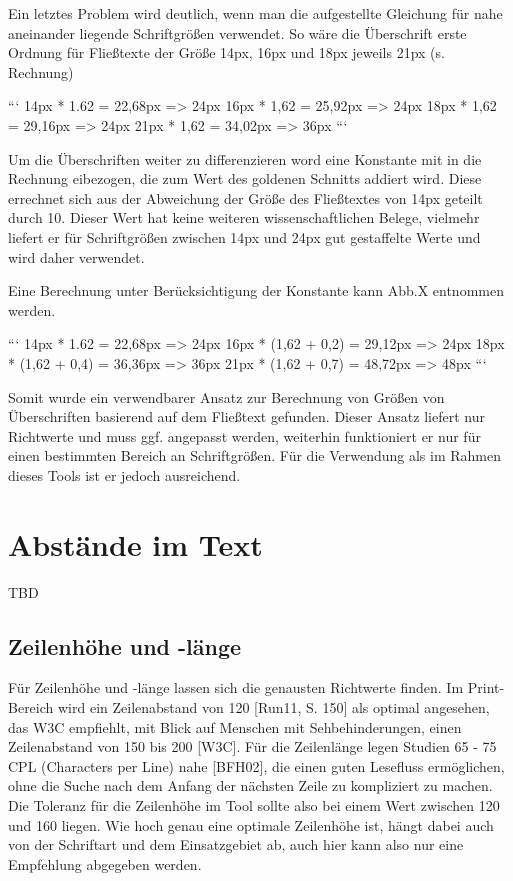Ein letztes Problem wird deutlich, wenn man die aufgestellte Gleichung für nahe aneinander liegende Schriftgrößen verwendet. So wäre die Überschrift erste Ordnung für Fließtexte der Größe 14px, 16px und 18px jeweils 21px (s. Rechnung)

```
14px * 1.62 = 22,68px => 24px
16px * 1,62 = 25,92px => 24px
18px * 1,62 = 29,16px => 24px
21px * 1,62 = 34,02px => 36px
```

Um die Überschriften weiter zu differenzieren word eine Konstante mit in die Rechnung eibezogen, die zum Wert des goldenen Schnitts addiert wird. Diese errechnet sich aus der Abweichung der Größe des Fließtextes von 14px geteilt durch 10.
Dieser Wert hat keine weiteren wissenschaftlichen Belege, vielmehr liefert er für Schriftgrößen zwischen 14px und 24px gut gestaffelte Werte und wird daher verwendet.

Eine Berechnung unter Berücksichtigung der Konstante kann Abb.X entnommen werden.

```
14px * 1.62 = 22,68px => 24px
16px * (1,62 + 0,2) = 29,12px => 24px
18px * (1,62 + 0,4) = 36,36px => 36px
21px * (1,62 + 0,7) = 48,72px => 48px
```

Somit wurde ein verwendbarer Ansatz zur Berechnung von Größen von Überschriften basierend auf dem Fließtext gefunden. Dieser Ansatz liefert nur Richtwerte und muss ggf. angepasst werden, weiterhin funktioniert er nur für einen bestimmten Bereich an Schriftgrößen. Für die Verwendung als im Rahmen dieses Tools ist er jedoch ausreichend.



\section{Abstände im Text}
TBD

\subsection{Zeilenhöhe und -länge}
Für Zeilenhöhe und -länge lassen sich die genausten Richtwerte finden. Im Print-Bereich wird ein Zeilenabstand von 120 [Run11, S. 150] als optimal angesehen, das W3C empfiehlt, mit Blick auf Menschen mit Sehbehinderungen, einen Zeilenabstand von 150 bis 200 [W3C]. Für die Zeilenlänge legen Studien 65 - 75 CPL (Characters per Line) nahe [BFH02], die einen guten Lesefluss ermöglichen, ohne die Suche nach dem Anfang der nächsten Zeile zu kompliziert zu machen.
Die Toleranz für die Zeilenhöhe im Tool sollte also bei einem Wert zwischen 120 und 160 liegen. Wie hoch genau eine optimale Zeilenhöhe ist, hängt dabei auch von der Schriftart und dem Einsatzgebiet ab, auch hier kann also nur eine Empfehlung abgegeben werden.

